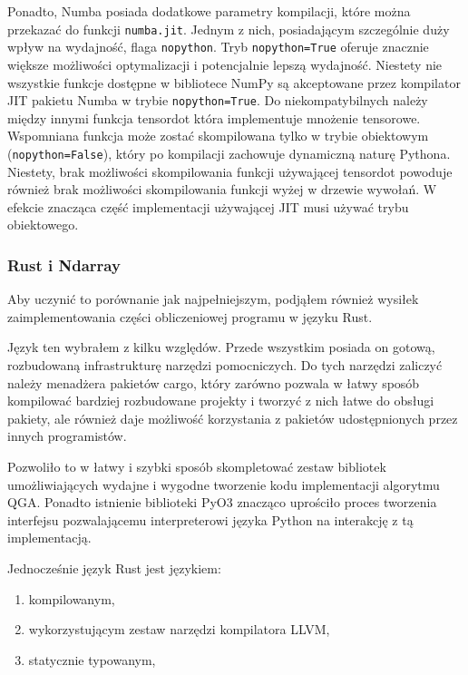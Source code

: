 \documentclass[11pt, a4paper]{article}
\newcommand{\code}[1]{\texttt{#1}}
\begin{document}
\begin{sloppypar}
    Ponadto, Numba posiada dodatkowe parametry kompilacji, które można przekazać do
    funkcji \code{numba.jit}. Jednym z nich, posiadającym szczególnie duży wpływ na wydajność,
    flaga \code{nopython}. Tryb \code{nopython=True} oferuje znacznie większe możliwości
    optymalizacji i potencjalnie lepszą wydajność. Niestety nie wszystkie funkcje
    dostępne w bibliotece NumPy są akceptowane przez kompilator JIT pakietu Numba w
    trybie \code{nopython=True}. Do niekompatybilnych należy między innymi funkcja
    tensordot która implementuje mnożenie tensorowe. Wspomniana funkcja może zostać skompilowana
    tylko w trybie obiektowym (\code{nopython=False}), który po kompilacji zachowuje dynamiczną
    naturę Pythona. Niestety, brak możliwości skompilowania funkcji używającej tensordot
    powoduje również brak możliwości skompilowania funkcji wyżej w drzewie wywołań. W
    efekcie znacząca część implementacji używającej JIT musi używać trybu obiektowego.

    \subsubsection{Rust i Ndarray}
    Aby uczynić to porównanie jak najpełniejszym, podjąłem również wysiłek zaimplementowania
    części obliczeniowej programu w języku Rust.

    Język ten wybrałem z kilku względów. Przede wszystkim posiada on gotową, rozbudowaną
    infrastrukturę narzędzi pomocniczych. Do tych narzędzi zaliczyć należy menadżera
    pakietów cargo, który zarówno pozwala w łatwy sposób kompilować bardziej rozbudowane
    projekty i tworzyć z nich łatwe do obsługi pakiety, ale również daje możliwość
    korzystania z pakietów udostępnionych przez innych programistów.

    Pozwoliło to w łatwy i szybki sposób skompletować zestaw bibliotek umożliwiających
    wydajne i wygodne tworzenie kodu implementacji algorytmu QGA. Ponadto istnienie biblioteki
    PyO3 znacząco uprościło proces tworzenia interfejsu pozwalającemu interpreterowi języka
    Python na interakcję z tą implementacją.

    Jednocześnie język Rust jest językiem:
    \begin{enumerate}
      \item kompilowanym,

      \item wykorzystującym zestaw narzędzi kompilatora LLVM,

      \item statycznie typowanym,


\end{enumerate}
\end{sloppypar}
\end{document}
